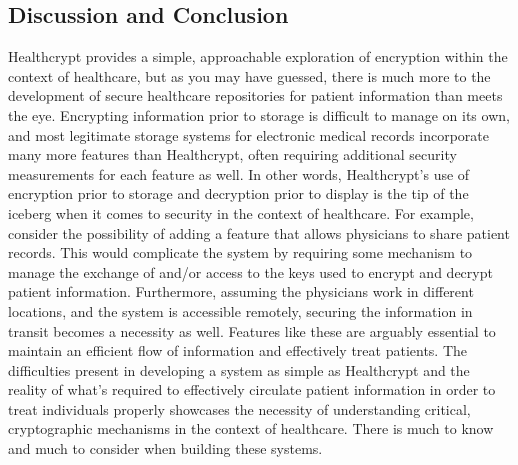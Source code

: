 \documentclass[letterpaper, 10pt,DIV=13]{scrartcl}
\begin{document}
\begin{multicols}{2}
\section*{Discussion and Conclusion}
\begin{spacing}{1.25}
Healthcrypt provides a simple, approachable exploration of encryption within the context of healthcare, but as you may have guessed, there is much more to the development of secure healthcare repositories for patient information than meets the eye. Encrypting information prior to storage is difficult to manage on its own, and most legitimate storage systems for electronic medical records incorporate many more features than Healthcrypt, often requiring additional security measurements for each feature as well. In other words, Healthcrypt's use of encryption prior to storage and decryption prior to display is the tip of the iceberg when it comes to security in the context of healthcare. For example, consider the possibility of adding a feature that allows physicians to share patient records. This would complicate the system by requiring some mechanism to manage the exchange of and/or access to the keys used to encrypt and decrypt patient information. Furthermore, assuming the physicians work in different locations, and the system is accessible remotely, securing the information in transit becomes a necessity as well. Features like these are arguably essential to maintain an efficient flow of information and effectively treat patients. The difficulties present in developing a system as simple as Healthcrypt and the reality of what's required to effectively circulate patient information in order to treat individuals properly showcases the necessity of understanding critical, cryptographic mechanisms in the context of healthcare. There is much to know and much to consider when building these systems.
\end{spacing}

\vspace{-2.5pt}




\end{multicols}
\end{document}

